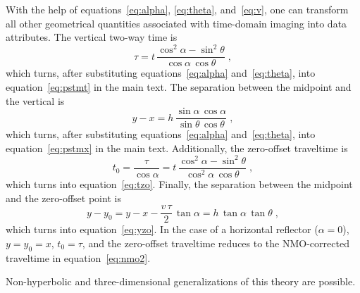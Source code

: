 With the help of equations~\ref{eq:alpha}, \ref{eq:theta},
and~\ref{eq:v}, one can transform all other geometrical quantities
associated with time-domain imaging into data attributes. The vertical
two-way time is \cite[]{GEO68-03-10651074}
\begin{equation}
\label{eq:tau}
\tau = t\,\frac{\cos^2{\alpha} -
\sin^2{\theta}}{\cos{\alpha}\,\cos{\theta}}\;,
\end{equation}
which turns, after substituting equations~\ref{eq:alpha}
and~\ref{eq:theta}, into equation~\ref{eq:pstmt} in the main
text. The separation between the midpoint and the vertical is
\cite[]{GEO68-03-10651074}
\begin{equation}
\label{eq:ymx}
y - x = h\,\frac{\sin{\alpha}\,\cos{\alpha}}{\sin{\theta}\,\cos{\theta}}\;,
\end{equation}
which turns, after substituting equations~\ref{eq:alpha}
and~\ref{eq:theta}, into equation~\ref{eq:pstmx} in the main text.
Additionally, the zero-offset traveltime is 
\begin{equation}
\label{eq:t0}
t_0 = \frac{\tau}{\cos{\alpha}} = t\,\frac{\cos^2{\alpha} -
\sin^2{\theta}}{\cos^2{\alpha}\,\cos{\theta}}\;,
\end{equation}
which turns into equation~\ref{eq:tzo}. Finally, the separation
between the midpoint and the zero-offset point is 
\begin{equation}
\label{eq:ymy0}
y - y_0 = y - x - \frac{v\,\tau}{2}\,\tan{\alpha} =
h\,\tan{\alpha}\,\tan{\theta}\;,
\end{equation}
which turns into equation~\ref{eq:yzo}. In the case of a horizontal
reflector ($\alpha=0$), $y=y_0=x$, $t_0 = \tau$, and the zero-offset
traveltime reduces to the NMO-corrected traveltime in
equation~\ref{eq:nmo2}.

Non-hyperbolic and three-dimensional generalizations of this theory are
possible.




